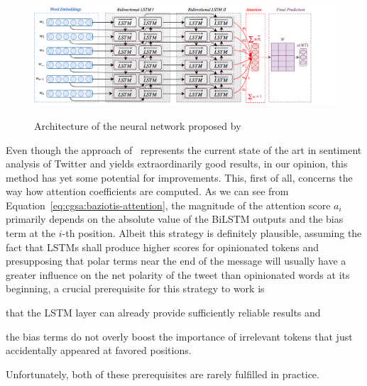 \begin{figure}[htbp!]
{
  \centering
  \includegraphics[width=\linewidth]{img/baziotis.png}
}
\caption[Neural network of \citet{Baziotis:17}]{Architecture of the
  neural network proposed
  by~\citet{Baziotis:17}}\label{cgsa:fig:baziotis}
\end{figure}

Even though the approach of~\citet{Baziotis:17} represents the current
state of the art in sentiment analysis of Twitter and yields
extraordinarily good results, in our opinion, this method has yet some
potential for improvements.  This, first of all, concerns the way how
attention coefficients are computed.  As we can see from
Equation~\ref{eq:cgsa:baziotis-attention}, the magnitude of the
attention score $a_i$ primarily depends on the absolute value of the
BiLSTM outputs and the bias term at the $i$-th position.  Albeit this
strategy is definitely plausible, assuming the fact that LSTMs shall
produce higher scores for opinionated tokens and presupposing that
polar terms near the end of the message will usually have a greater
influence on the net polarity of the tweet than opinionated words at
its beginning, a crucial prerequisite for this strategy to work is
\begin{inparaenum}[(i)]
\item that the LSTM layer can already provide sufficiently reliable
  results and
\item the bias terms do not overly boost the importance of irrelevant
  tokens that just accidentally appeared at favored positions.
\end{inparaenum}
Unfortunately, both of these prerequisites are rarely fulfilled in
practice.

